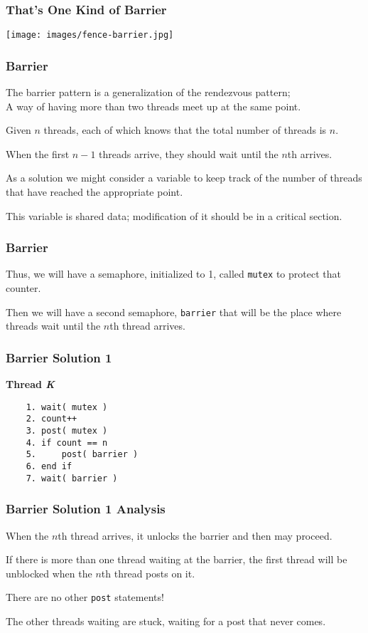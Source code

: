 \begin{frame}
	\frametitle{That's One Kind of Barrier}

	\begin{center}
		\texttt{[image: images/fence-barrier.jpg]}
	\end{center}

\end{frame}


\begin{frame}
	\frametitle{Barrier}

	The barrier pattern is a generalization of the rendezvous pattern;\\
	\quad A way of having more than two threads meet up at the same point.

	Given $n$ threads, each of which knows that the total number of threads is $n$.

	When the first $n-1$ threads arrive, they should wait until the $n$th arrives.

	As a solution we might consider a variable to keep track of the number of threads that have reached the appropriate point.

	This variable is shared data; modification of it should be in a critical section.


\end{frame}

\begin{frame}
	\frametitle{Barrier}

	Thus, we will have a semaphore, initialized to 1, called \texttt{mutex} to protect that counter.

	Then we will have a second semaphore, \texttt{barrier} that will be the place where threads wait until the $n$th thread arrives.


\end{frame}

\begin{frame}[fragile]
	\frametitle{Barrier Solution 1}

	\textbf{Thread \textit{K}}\vspace{-10em}
	\begin{verbatim}
	1. wait( mutex )
	2. count++
	3. post( mutex )
	4. if count == n
	5.     post( barrier )
	6. end if
	7. wait( barrier )
  	\end{verbatim}
	\vspace{-2em}


\end{frame}

\begin{frame}
	\frametitle{Barrier Solution 1 Analysis}

	When the $n$th thread arrives, it unlocks the barrier and then may proceed.

	If there is more than one thread waiting at the barrier, the first thread will be unblocked when the $n$th thread posts on it.

	There are no other \texttt{post} statements!

	The other threads waiting are stuck, waiting for a post that never comes.


\end{frame}


